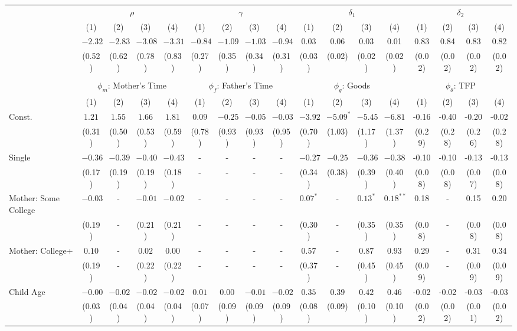 \begin{tabular}{lcccccccccccccccc}\\\toprule
 & \multicolumn{4}{c}{$\rho$} & \multicolumn{4}{c}{$\gamma$} & \multicolumn{4}{c}{$\delta_{1}$} & \multicolumn{4}{c}{$\delta_{2}$} \\
&(1)&(2)&(3)&(4)&(1)&(2)&(3)&(4)&(1)&(2)&(3)&(4)&(1)&(2)&(3)&(4)\\\cmidrule(r){2-5}\cmidrule(r){6-9}\cmidrule(r){10-13}\cmidrule(r){14-17}
&$-2.32$&$-2.83$&$-3.08$&$-3.31$&$-0.84$&$-1.09$&$-1.03$&$-0.94$&0.03&0.06&0.03&0.01&0.83&0.84&0.83&0.82\\
&(0.52)&(0.62)&(0.78)&(0.83)&(0.27)&(0.35)&(0.34)&(0.31)&(0.03)&(0.02)&(0.02)&(0.02)&(0.02)&(0.02)&(0.02)&(0.02)\\
&&&&&&&&&&&&&&&&\\
 & \multicolumn{4}{c}{$\phi_{m}$: Mother's Time} & \multicolumn{4}{c}{$\phi_{f}$: Father's Time} & \multicolumn{4}{c}{$\phi_{g}$: Goods} & \multicolumn{4}{c}{$\phi_{\theta}$: TFP} \\
&(1)&(2)&(3)&(4)&(1)&(2)&(3)&(4)&(1)&(2)&(3)&(4)&(1)&(2)&(3)&(4)\\\cmidrule(r){2-5}\cmidrule(r){6-9}\cmidrule(r){10-13}\cmidrule(r){14-17}
Const.&$1.21$&$1.55$&$1.66$&$1.81$&$0.09$&$-0.25$&$-0.05$&$-0.03$&$-3.92$&$-5.09^{*}$&$-5.45$&$-6.81$&-0.16&-0.40&-0.20&-0.02\\
&(0.31)&(0.50)&(0.53)&(0.59)&(0.78)&(0.93)&(0.93)&(0.95)&(0.70)&(1.03)&(1.17)&(1.37)&(0.29)&(0.28)&(0.26)&(0.28)\\
Single&$-0.36$&$-0.39$&$-0.40$&$-0.43$&-&-&-&-&$-0.27$&$-0.25$&$-0.36$&$-0.38$&-0.10&-0.10&-0.13&-0.13\\
&(0.17)&(0.19)&(0.19)&(0.18)&-&-&-&-&(0.34)&(0.38)&(0.39)&(0.40)&(0.08)&(0.08)&(0.07)&(0.08)\\
Mother: Some College&$-0.03$&-&$-0.01$&$-0.02$&-&-&-&-&$0.07^{*}$&-&$0.13^{*}$&$0.18^{**}$&0.18&-&0.15&0.20\\
&(0.19)&-&(0.21)&(0.21)&-&-&-&-&(0.30)&-&(0.35)&(0.35)&(0.08)&-&(0.08)&(0.08)\\
Mother: College+&$0.10$&-&$0.02$&$0.00$&-&-&-&-&$0.57$&-&$0.87$&$0.93$&0.29&-&0.31&0.34\\
&(0.19)&-&(0.22)&(0.22)&-&-&-&-&(0.37)&-&(0.45)&(0.45)&(0.09)&-&(0.09)&(0.09)\\
Child Age&$-0.00$&$-0.02$&$-0.02$&$-0.02$&$0.01$&$0.00$&$-0.01$&$-0.02$&$0.35$&$0.39$&$0.42$&$0.46$&-0.02&-0.02&-0.03&-0.03\\
&(0.03)&(0.04)&(0.04)&(0.04)&(0.07)&(0.09)&(0.09)&(0.09)&(0.08)&(0.09)&(0.10)&(0.10)&(0.02)&(0.02)&(0.01)&(0.02)\\

\end{tabular}
